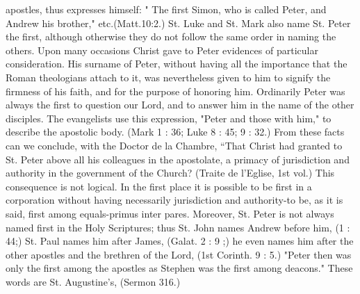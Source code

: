 apostles, thus expresses himself: " The first Simon, who is called Peter, and Andrew his brother," etc.(Matt.10:2.) St. Luke and St. Mark also name St. Peter the first, although otherwise they do not follow the same order in naming the others. Upon many occasions Christ gave to Peter evidences of particular consideration. His surname of Peter, without having all the importance that the Roman theologians attach to it, was nevertheless given to him to signify the firmness of his faith, and for the purpose of honoring him. Ordinarily Peter was always the first to question our Lord, and to answer him in the name of the other disciples. The evangelists use this expression, "Peter and those with him," to describe the apostolic body. (Mark 1 : 36; Luke 8 : 45; 9 : 32.) From these facts can we conclude, with the Doctor de la Chambre, “That Christ had granted to St. Peter above all his colleagues in the apostolate, a primacy of jurisdiction and authority in the government of the Church? (Traite de l'Eglise, 1st vol.) This consequence is not logical. In the first place it is possible to be first in a corporation without having necessarily jurisdiction and authority-to be, as it is said, first among equals-primus inter pares. Moreover, St. Peter is not always named first in the Holy Scriptures; thus St. John names Andrew before him, (1 : 44;) St. Paul names him after James, (Galat. 2 : 9 ;) he even names him after the other apostles and the brethren of the Lord, (1st Corinth. 9 : 5.) "Peter then was only the first among the apostles as Stephen was the first among deacons." These words are St. Augustine's, (Sermon 316.)

